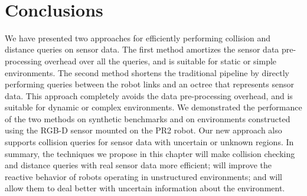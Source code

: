 \begin{table}[ht]
\centering
{}
\\
\caption[Collision and distance query performance comparison between the baseline pipeline in~\cite{Rusu:RPG:2009} and our new pipeline on the PR2 robot]{Collision and distance query performance comparison between the baseline pipeline in~\cite{Rusu:RPG:2009} and our new pipeline on the PR2 robot (in ms). For collision query, the broad-phase structure computed by the baseline algorithm improves the total computation only when there are more than $N_{min} = 3275$ collision queries for one frame of sensor data, and the total time required for $N_{min}$ queries is 4.29 ms. For distance query, the broad-phase structure computed by the baseline algorithm improves the total computation only when there are more than $N_{min} = 18$ collision queries for one frame of sensor data, and the total time required for $N_{min}$ queries is 0.87 ms.
\label{table:8:pr2}}
\end{table}




\section{Conclusions}

We have presented two approaches for efficiently performing collision and distance
queries on sensor data. The first method amortizes the sensor data pre-processing
overhead over all the queries, and is suitable for static or simple
environments. The second method shortens the traditional pipeline by
directly performing queries between the robot links and an octree that
represents sensor data. This approach completely avoids the data
pre-processing overhead, and is suitable for dynamic or complex
environments. We demonstrated the performance of the two methods on
synthetic benchmarks and on environments constructed using the RGB-D
sensor mounted on the PR2 robot. Our new approach also supports
collision queries for sensor data with uncertain or unknown regions.
In summary, the techniques we propose in this chapter will make
collision checking and distance queries with real sensor data more efficient;
will improve the reactive behavior of robots operating in unstructured
environments; and will allow them to deal better with uncertain information
about the environment.

